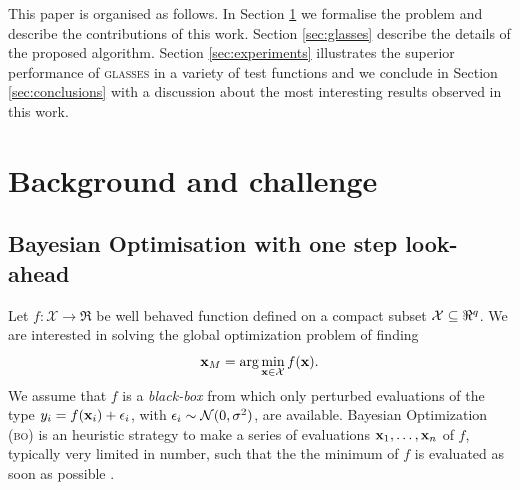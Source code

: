 \documentclass[twoside]{article}
\newcommand{\acr}[1]{\textsc{#1}\xspace}
\newcommand{\us}{\acr{glasses}}
\newcommand{\bo}{\acr{bo}}
\begin{document}

This paper is organised as follows. In Section \ref{sec:background} we formalise the problem and describe the contributions of this work. Section \ref{sec:glasses} describe the details of the proposed algorithm. Section \ref{sec:experiments} illustrates the superior performance of \us in a variety of test functions and we conclude in Section \ref{sec:conclusions} with a discussion about the most interesting results observed in this work.


\section{Background and challenge}\label{sec:background}
\subsection{Bayesian Optimisation with one step look-ahead} %
\label{sec:bayesian_optimisation}



Let $f: {\mathcal X} \to \Re$ be well behaved function defined on a compact subset ${\mathcal X} \subseteq \Re^{q}$. We are interested in solving the global optimization problem of finding 
$$\mathbf{x}_{M} = \arg \min_{\mathbf{x} \in {\mathcal X}} f(\mathbf{x}).$$ 
We assume that $f$ is a \emph{black-box} from which only perturbed evaluations of the type $y_i = f(\mathbf{x}_i) + \epsilon_i$, with $\epsilon_i \sim\mathcal{N}(0,\sigma^2)$, are  available. Bayesian Optimization (\bo) is an heuristic strategy to make a series of evaluations $\mathbf{x}_1,\dots,\mathbf{x}_n$ of $f$, typically very limited in number,  such that the the minimum of $f$ is evaluated as soon as possible \citep{Lizotte_2008,Jones_2001,Snoek*Larochelle*Adams_2012,Brochu*Cora*DeFreitas_2010}.
\end{document}

